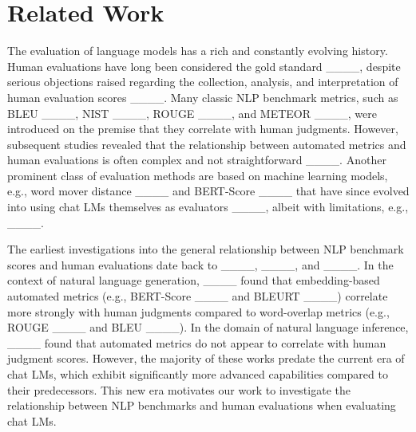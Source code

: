 \section{Related Work}
\label{app:sec:related_work}

The evaluation of language models has a rich and constantly evolving history. Human evaluations have long been considered the gold standard ____, despite serious objections raised regarding the collection, analysis, and interpretation of human evaluation scores ____. Many classic NLP benchmark metrics, such as BLEU ____, NIST ____, ROUGE ____, and METEOR ____, were introduced on the premise that they correlate with human judgments. However, subsequent studies revealed that the relationship between automated metrics and human evaluations is often complex and not straightforward ____. Another prominent class of evaluation methods are based on machine learning models, e.g., word mover distance ____ and BERT-Score ____ that have since evolved into using chat LMs themselves as evaluators ____, albeit with limitations, e.g., ____.

The earliest investigations into the general relationship between NLP benchmark scores and human evaluations date back to ____, ____, and ____. In the context of natural language generation, ____ found that embedding-based automated metrics (e.g., BERT-Score ____ and BLEURT ____) correlate more strongly with human judgments compared to word-overlap metrics (e.g., ROUGE ____ and BLEU ____). In the domain of natural language inference, ____ found that automated metrics do not appear to correlate with human judgment scores. However, the majority of these works predate the current era of chat LMs, which exhibit significantly more advanced capabilities compared to their predecessors. This new era motivates our work to investigate the relationship between NLP benchmarks and human evaluations when evaluating chat LMs.